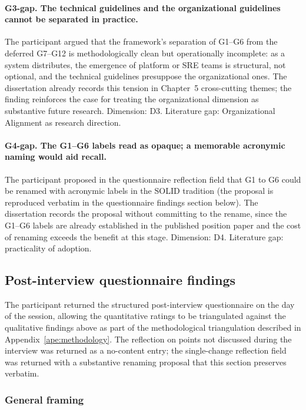 \paragraph*{G3-gap. The technical guidelines and the organizational guidelines cannot be separated in practice.} The participant argued that the framework's separation of G1--G6 from the deferred G7--G12 is methodologically clean but operationally incomplete: as a system distributes, the emergence of platform or SRE teams is structural, not optional, and the technical guidelines presuppose the organizational ones. The dissertation already records this tension in Chapter~5 cross-cutting themes; the finding reinforces the case for treating the organizational dimension as substantive future research. Dimension: D3. Literature gap: Organizational Alignment as research direction.

\paragraph*{G4-gap. The G1--G6 labels read as opaque; a memorable acronymic naming would aid recall.} The participant proposed in the questionnaire reflection field that G1 to G6 could be renamed with acronymic labels in the SOLID tradition (the proposal is reproduced verbatim in the questionnaire findings section below). The dissertation records the proposal without committing to the rename, since the G1--G6 labels are already established in the published position paper and the cost of renaming exceeds the benefit at this stage. Dimension: D4. Literature gap: practicality of adoption.

\subsection*{Post-interview questionnaire findings}

The participant returned the structured post-interview questionnaire on the day of the session, allowing the quantitative ratings to be triangulated against the qualitative findings above as part of the methodological triangulation described in Appendix~\ref{ape:methodology}. The reflection on points not discussed during the interview was returned as a no-content entry; the single-change reflection field was returned with a substantive renaming proposal that this section preserves verbatim.

\subsubsection*{General framing}

